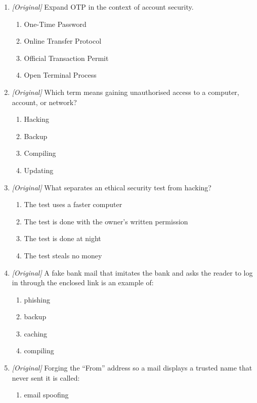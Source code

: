 \begin{enumerate}[label=\textbf{Q\arabic*.}, leftmargin=*]
\item \textit{[Original]} Expand OTP in the context of account security.
  \begin{enumerate}[label=\Alph*.]
    \item One-Time Password
    \item Online Transfer Protocol
    \item Official Transaction Permit
    \item Open Terminal Process
  \end{enumerate}
\item \textit{[Original]} Which term means gaining unauthorised access to
  a computer, account, or network?
  \begin{enumerate}[label=\Alph*.]
    \item Hacking
    \item Backup
    \item Compiling
    \item Updating
  \end{enumerate}
\item \textit{[Original]} What separates an ethical security test from
  hacking?
  \begin{enumerate}[label=\Alph*.]
    \item The test uses a faster computer
    \item The test is done with the owner's written permission
    \item The test is done at night
    \item The test steals no money
  \end{enumerate}
\item \textit{[Original]} A fake bank mail that imitates the bank and asks
  the reader to log in through the enclosed link is an example of:
  \begin{enumerate}[label=\Alph*.]
    \item phishing
    \item backup
    \item caching
    \item compiling
  \end{enumerate}
\item \textit{[Original]} Forging the ``From'' address so a mail displays
  a trusted name that never sent it is called:
  \begin{enumerate}[label=\Alph*.]
    \item email spoofing

\end{enumerate}
\end{enumerate}

